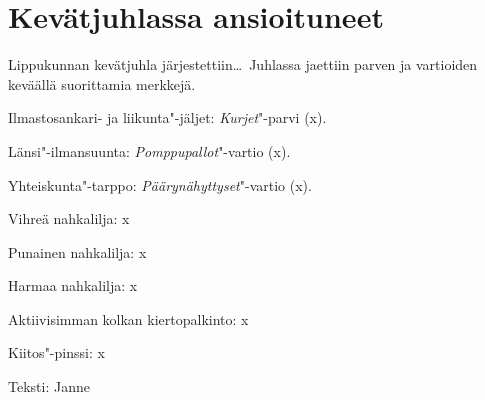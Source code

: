 \section{Kevätjuhlassa ansioituneet}

\begin{multicols}{2}
\noindent Lippukunnan kevätjuhla järjestettiin\ldots\ Juhlassa jaettiin parven ja vartioiden keväällä suorittamia merkkejä.

Ilmastosankari- ja liikunta"-jäljet: \textit{Kurjet}"-parvi (x).

Länsi"-ilmansuunta: \textit{Pomppupallot}"-vartio (x).

Yhteiskunta"-tarppo: \textit{Päärynähyttyset}"-vartio (x).

Vihreä nahkalilja: x

Punainen nahkalilja: x

Harmaa nahkalilja: x

Aktiivisimman kolkan kiertopalkinto: x

Kiitos"-pinssi: x
\end{multicols}

\medskip

\noindent\null\hfill Teksti: Janne
